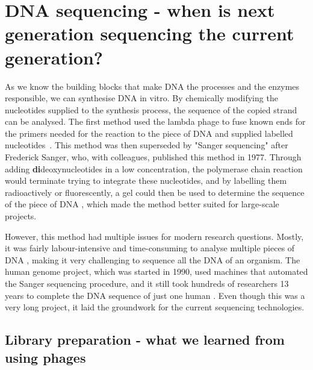 \section[DNA sequencing]{DNA sequencing - when is next generation sequencing the current generation?}
\label{intro-sec:sequencing}

As we know the building blocks that make DNA  the processes and the enzymes responsible, we can synthesise DNA in vitro. By chemically modifying the nucleotides supplied to the synthesis process, the sequence of the copied strand can be analysed. The first method  used the lambda phage to fuse known ends for the primers needed for the reaction to the piece of DNA and supplied labelled nucleotides~\cite{Padmanabhan1974}. This method was then superseded by "Sanger sequencing" after Frederick Sanger, who, with colleagues, published this method in 1977. Through adding \textbf{di}deoxynucleotides in a low concentration, the polymerase chain reaction would terminate trying to integrate these nucleotides, and by labelling them radioactively or fluorescently, a gel could then be used to determine the sequence of the piece of DNA \cite{Sanger1975,Sanger1977}, which made the method better suited for large-scale projects.

However, this method had multiple issues for modern research questions. Mostly,  it was fairly labour-intensive and time-consuming to analyse multiple pieces of DNA , making it very challenging to sequence all the DNA of an organism. The human genome project, which was started in 1990, used machines that automated the Sanger sequencing procedure, and it still took hundreds of researchers 13 years to complete the DNA sequence of just one human \cite{Lander2001,Venter2001}. Even though this was a very long project, it laid the groundwork for  the current sequencing technologies.

\subsection[Library preparation]{Library preparation - what we learned from using phages}
\label{intro-sec:libraryprep}

